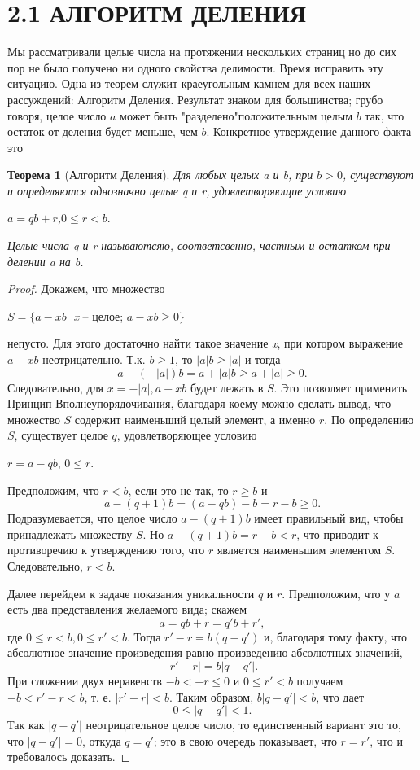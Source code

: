 \documentclass[11pt]{article}
\newtheorem{theorem}{Теорема}
\begin{document}
\leftskip=-0.9cm \section*{2.1 АЛГОРИТМ ДЕЛЕНИЯ}
\Large \leftskip=-0.9cm \rightskip=-0.9cm \thispagestyle{1} Мы рассматривали целые числа на протяжении нескольких страниц но до сих пор не было получено ни одного свойства делимости. Время исправить эту ситуацию. Одна из теорем служит краеугольным камнем для всех наших рассуждений: Алгоритм Деления. Результат знаком для большинства; грубо говоря, целое число $a$ может быть "разделено"\:положительным целым $b$ так, что остаток от деления будет меньше, чем $b$. Конкретное утверждение данного факта это\\
\begin{theorem}[Алгоритм Деления] Для любых целых a и b, при $b>0$, существуют и определяются однозначно целые q и r, удовлетворяющие условию
\begin{flushright}
$a=qb+r$,\qquad \qquad \qquad \qquad \qquad $0\leq r<b.$
\end{flushright}
Целые числа q и r называютсяю,  соответсвенно, частным и остатком при делении a на b.
\end{theorem}

\begin{proof}
Докажем, что множество
\begin{center}
	$S=\{a-xb|$ \textit{x} -- целое; $a-xb\geq0\}$
\end{center} 
непусто. Для этого достаточно найти такое значение \textit{x}, при котором выражение $a-xb$ неотрицательно. Т.к. $b\geq1$, то $|a|b\geq |a|$ и тогда
\[a-(-|a|)b=a+|a|b\geq a+|a|\geq 0.\]
Следовательно, для $x=-|a|,a-xb$ будет лежать в $S$. Это позволяет применить Принцип Вполнеупорядочивания, благодаря коему можно сделать вывод, что множество $S$ содержит наименьший целый элемент, а именно $r$. По определению $S$, существует целое $q$, удовлетворяющее условию
\begin{flushright}
	$r=a-qb$, \qquad \qquad \qquad \qquad \qquad \qquad $0\leq r$.
\end{flushright}
Предположим, что $r<b$, если это не так, то $r\geq b$ и
\[a-(q+1)b=(a-qb)-b=r-b\geq 0.\]
Подразумевается, что целое число $a-(q+1)b$ имеет правильный вид, чтобы принадлежать множеству $S$. Но $a-(q+1)b=r-b<r$, что приводит к противоречию к утверждению того, что $r$ является наименьшим элементом $S$. Следовательно, $r<b$.

\qquad \quad \thispagestyle{2} Далее перейдем к задаче показания уникальности $q$ и $r$. Предположим, что у $a$ есть два представления желаемого вида; скажем
\[a=qb+r=q'b+r',\] 
где $0\leq r<b, 0\leq r'<b$. Тогда $r'-r=b(q-q')$ и, благодаря тому факту, что абсолютное значение произведения равно произведению абсолютных значений,
\[|r'-r|=b|q-q'|.\]
При сложении двух неравенств $-b<-r\leq 0$ и $0\leq r'<b$ получаем $-b<r'-r<b$, т. е. $|r'-r|<b$. Таким образом, $b|q-q'|<b$, что дает
\[0\leq |q-q'|<1.\]
Так как $|q-q'|$ неотрицательное целое число, то единственный вариант это то, что $|q-q'|=0$, откуда $q=q'$; это в свою очередь показывает, что $r=r'$, что и требовалось доказать.
\end{proof}
\end{document}
